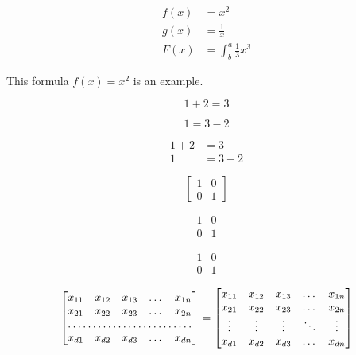 \documentclass{article}
\begin{document}
\begin{align*}
  f(x) &= x^2\\
  g(x) &= \frac{1}{x}\\
  F(x) &= \int^a_b \frac{1}{3}x^3
\end{align*}

This formula $f(x) = x^2$ is an example.


\begin{equation*}
  1 + 2 = 3 
\end{equation*}

\begin{equation*}
  1 = 3 - 2
\end{equation*}


\begin{align*}
  1 + 2 &= 3\\
  1 &= 3 - 2
\end{align*}

\[
\begin{bmatrix}
	1 & 0\\
	0 & 1
\end{bmatrix}
\]


\[
\begin{matrix}
	1 & 0\\
	0 & 1
\end{matrix}
\]


\[
\begin{matrix}
		1 & 0\\
		0 & 1
\end{matrix}
\]


\[
\begin{bmatrix}
    x_{11}       & x_{12} & x_{13} & \dots & x_{1n} \\
    x_{21}       & x_{22} & x_{23} & \dots & x_{2n} \\
    \hdotsfor{5} \\
    x_{d1}       & x_{d2} & x_{d3} & \dots & x_{dn}
\end{bmatrix}
=
\begin{bmatrix}
    x_{11} & x_{12} & x_{13} & \dots  & x_{1n} \\
    x_{21} & x_{22} & x_{23} & \dots  & x_{2n} \\
    \vdots & \vdots & \vdots & \ddots & \vdots \\
    x_{d1} & x_{d2} & x_{d3} & \dots  & x_{dn}
\end{bmatrix}
\]
\end{document}
